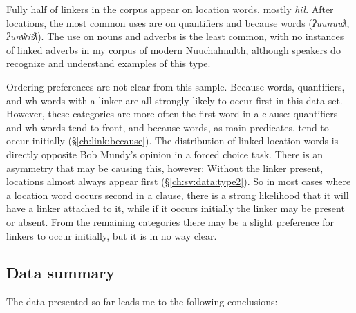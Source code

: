 Fully half of linkers in the corpus appear on location words, mostly \textit{hił}. After locations, the most common uses are on quantifiers and because words (\textit{ʔuunuuƛ}, \textit{ʔunw̓iiƛ}). The use on nouns and adverbs is the least common, with no instances of linked adverbs in my corpus of modern Nuuchahnulth, although speakers do recognize and understand examples of this type.

Ordering preferences are not clear from this sample. Because words, quantifiers, and wh-words with a linker are all strongly likely to occur first in this data set. However, these categories are more often the first word in a clause: quantifiers and wh-words tend to front, and because words, as main predicates, tend to occur initially (\S\ref{ch:link:because}). The distribution of linked location words is directly opposite Bob Mundy's opinion in a forced choice task. There is an asymmetry that may be causing this, however: Without the linker present, locations almost always appear first (\S\ref{ch:sv:data:type2}). So in most cases where a location word occurs second in a clause, there is a strong likelihood that it will have a linker attached to it, while if it occurs initially the linker may be present or absent. From the remaining categories there may be a slight preference for linkers to occur initially, but it is in no way clear.

\subsection{Data summary}

The data presented so far leads me to the following conclusions:

